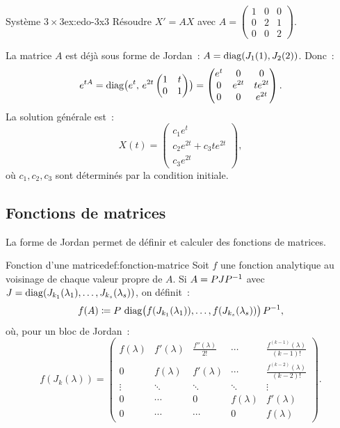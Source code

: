 \begin{example}{Système $3\times 3$}{ex:edo-3x3}
  Résoudre $X'=AX$ avec
  $A=\begin{pmatrix}1&0&0\\0&2&1\\0&0&2\end{pmatrix}$.

  La matrice $A$ est déjà sous forme de Jordan~:
  $A=\operatorname{diag}(J_1(1),J_2(2))$. Donc~:
  \[
    e^{tA}=\operatorname{diag}\bigl(e^t,\,e^{2t}\begin{pmatrix}1&t\\0&1\end{pmatrix}\bigr)
    =\begin{pmatrix}e^t&0&0\\0&e^{2t}&te^{2t}\\0&0&e^{2t}\end{pmatrix}.
  \]
  La solution générale est~:
  \[
    X(t)=\begin{pmatrix}c_1e^t\\c_2e^{2t}+c_3te^{2t}\\c_3e^{2t}\end{pmatrix},
  \]
  où $c_1,c_2,c_3$ sont déterminés par la condition initiale.
\end{example}


\subsection{Fonctions de matrices}\label{subsec:fonctions-matrices}

La forme de Jordan permet de définir et calculer des fonctions de
matrices.

\begin{definition}{Fonction d'une matrice}{def:fonction-matrice}
  Soit $f$ une fonction analytique au voisinage de chaque valeur propre
  de $A$. Si $A=P J{P}^{-1}$ avec $J=\operatorname{diag}(J_{k_1}(\lambda_1),\ldots,
  J_{k_s}(\lambda_s))$, on définit~:
  \[
    f(A)\coloneqq P\,\operatorname{diag}\bigl(f(J_{k_1}(\lambda_1)),\ldots,
    f(J_{k_s}(\lambda_s))\bigr)\,{P}^{-1},
  \]
  où, pour un bloc de Jordan~:
  \[
    f(J_k(\lambda))=\begin{pmatrix}
      f(\lambda)   & f'(\lambda)  & \frac{f''(\lambda)}{2!}
        & \cdots & \frac{f^{(k-1)}(\lambda)}{(k-1)!} \\
      0 & f(\lambda) & f'(\lambda) & \cdots
        & \frac{f^{(k-2)}(\lambda)}{(k-2)!} \\
      \vdots & \ddots & \ddots & \ddots & \vdots \\
      0 & \cdots & 0 & f(\lambda) & f'(\lambda) \\
      0 & \cdots & \cdots & 0 & f(\lambda)
    \end{pmatrix}.
  \]
\end{definition}

